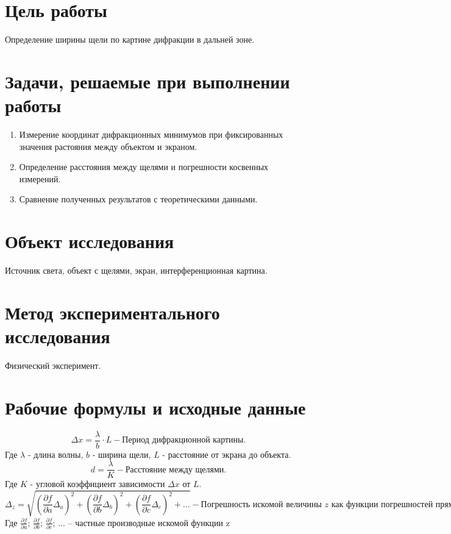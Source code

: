 \documentclass{article}
\begin{document}
\section{Цель работы}
\begin{enumerate}
     Определение ширины щели по картине дифракции в дальней зоне.
\end{enumerate}

\section{Задачи, решаемые при выполнении работы}
\begin{enumerate}
    \item Измерение координат дифракционных минимумов при фиксированных значения растояния между объектом и экраном.
    \item Определение расстояния между щелями и погрешности косвенных измерений.
    \item Сравнение полученных результатов с теоретическими данными.
\end{enumerate}

\section{Объект исследования}
Источник света, объект с щелями, экран, интерференционная картина.
\section{Метод экспериментального исследования}
Физический эксперимент.
\section{Рабочие формулы и исходные данные}
\begin{equation}
 \Delta x=\frac{\lambda}{b}\cdot L - \textit{Период дифракционной картины.}
 \label{eq:ref1}
\end{equation}
Где $\lambda$ - длина волны, $b$ - ширина щели, $L$ - расстояние от экрана
до объекта.
\begin{equation}
 d=\frac{\lambda}{K} - \textit{Расстояние между щелями.}
 \label{eq:ref2}
\end{equation}
Где $K$ - угловой коэффициент зависимости $\Delta x$ от $L$.
\begin{equation}
 \Delta_{z}=\sqrt{(\frac{\partial f}{\partial a}\Delta_{a})^2 + (\frac{\partial f}{\partial b}\Delta_{b})^2 + (\frac{\partial f}{\partial c}\Delta_{c})^2 + ...} - \textit{Погрешность искомой величины z как функции погрешностей прямо измеренных величин.}
 \label{eq:ref3}
\end{equation}
Где $\frac{\partial f}{\partial a}$; $\frac{\partial f}{\partial b}$; $\frac{\partial f}{\partial c}$; ... – частные производные искомой функции z
\newpage
\end{document}

